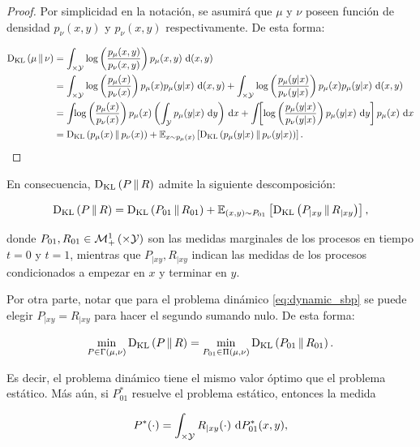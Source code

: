 \begin{proof}
	Por simplicidad en la notación, se asumirá que $\mu$ y $\nu$ poseen función de densidad $p_\nu(x,y)$ y $p_\nu(x,y)$ respectivamente. De esta forma:

	\begin{align*}
		\operatorname{D_{KL}}\left(\mu\,\|\,\nu\right) &= \int_{\times\mathcal{Y}} \log\left(\frac{p_\mu(x,y)}{p_\nu(x,y)}\right) p_\mu(x,y) \,\operatorname{d}\!\,(x,y)\\
		&= \int_{\times\mathcal{Y}} \log\left(\frac{p_\mu(x)}{p_\nu(x)}\right) p_\mu(x)p_\mu(y|x) \,\operatorname{d}\!\,(x,y) + \int_{\times\mathcal{Y}} \log\left(\frac{p_\mu(y|x)}{p_\nu(y|x)}\right) p_\mu(x)p_\mu(y|x) \,\operatorname{d}\!\,(x,y)\\
		&= \int_{} \log\left(\frac{p_\mu(x)}{p_\nu(x)}\right) p_\mu(x)\left(\int_{\mathcal{Y}} p_\mu(y|x) \,\operatorname{d}\! y\right)\,\operatorname{d}\! x + \int_{} \left[\log\left(\frac{p_\mu(y|x)}{p_\nu(y|x)}\right) p_\mu(y|x) \,\operatorname{d}\! y\right]p_\mu(x) \,\operatorname{d}\! x\\
		&= \operatorname{D_{KL}}\left(p_\mu(x)\,\|\,p_\nu(x)\right) + \mathbb{E}_{x\sim p_\mu(x)}\left[\operatorname{D_{KL}}\left(p_\mu(y|x)\,\|\,p_\nu(y|x)\right)\right].
	\end{align*}
\end{proof}

En consecuencia, $\operatorname{D_{KL}}\left(P\,\|\,R\right)$ admite la siguiente descomposición:

\begin{equation*}
	\operatorname{D_{KL}}\left(P\,\|\,R\right) = \operatorname{D_{KL}}\left(P_{01}\,\|\,R_{01}\right) + \mathbb{E}_{(x,y)\sim P_{01}}\left[\operatorname{D_{KL}}\left(P_{|xy}\,\|\,R_{|xy}\right)\right],
\end{equation*}

donde $P_{01},R_{01}\in\probmeasure{\xspace\times\yspace}$ son las medidas marginales de los procesos en tiempo $t=0$ y $t=1$, mientras que $P_{|xy}, R_{|xy}$ indican las medidas de los procesos condicionados a empezar en $x$ y terminar en $y$.

Por otra parte, notar que para el problema dinámico \eqref{eq:dynamic_sbp} se puede elegir $P_{|xy}=R_{|xy}$ para hacer el segundo sumando nulo. De esta forma:

\begin{equation*}
	\min_{P\in\Gamma(\mu,\nu)} \operatorname{D_{KL}}\left(P\,\|\,R\right) = \min_{P_{01}\in\Pi(\mu,\nu)} \operatorname{D_{KL}}\left(P_{01}\,\|\,R_{01}\right).
\end{equation*}

Es decir, el problema dinámico tiene el mismo valor óptimo que el problema estático. Más aún, si $P_{01}^*$ resuelve el problema estático, entonces la medida

\begin{equation*}
	P^*(\cdot) = \int_{\times\mathcal{Y}} R_{|xy}(\cdot) \,\operatorname{d}\! P_{01}^*(x,y),
\end{equation*}

